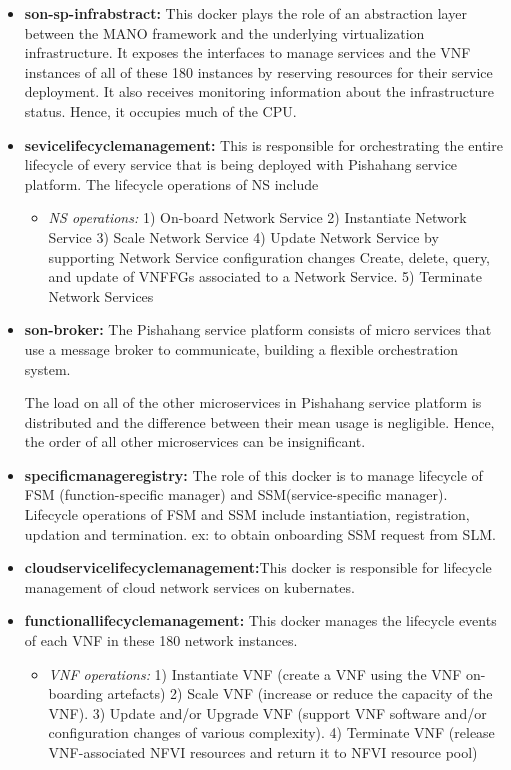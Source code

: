 \begin{itemize}
	\item \textbf{son-sp-infrabstract:} This docker plays the role of an abstraction layer between the MANO framework and the underlying virtualization infrastructure. It exposes the interfaces to manage services and the VNF instances of all of these 180 instances by reserving resources for their service deployment. It also receives monitoring information about the infrastructure status. Hence, it occupies much of the CPU.
	\item \textbf{sevicelifecyclemanagement:} This is responsible for orchestrating the entire lifecycle of every service that is being deployed with Pishahang service platform. The lifecycle operations of NS include
	
	\begin{itemize}
		\item \textit{NS operations:} 
		1) On-board Network Service
		2) Instantiate Network Service
		3) Scale Network Service
		4) Update Network Service by supporting Network Service configuration changes
		Create, delete, query, and update of VNFFGs associated to a Network Service.
		5) Terminate Network Services
		
	\end{itemize}

	\item \textbf{son-broker:} The Pishahang service platform consists of micro services that use a message broker to communicate, building a flexible orchestration system.
	
The load on all of the other microservices in Pishahang service platform is distributed and the difference between their mean usage is negligible. Hence, the order of all other microservices can be insignificant.

	
	\item \textbf{specificmanageregistry:} The role of this docker is to manage lifecycle of FSM (function-specific manager) and SSM(service-specific manager). Lifecycle operations of FSM and SSM include instantiation, registration, updation and termination. ex: to obtain onboarding SSM request from SLM.
	\item \textbf{cloudservicelifecyclemanagement:}This docker is responsible for lifecycle management of cloud network services on kubernates.
	\item \textbf{functionallifecyclemanagement:}  This docker manages the lifecycle events of each VNF in these 180 network instances. 

\begin{itemize}
		
	\item \textit{VNF operations:} 1) Instantiate VNF (create a VNF using the VNF on-boarding artefacts)
	2) Scale VNF (increase or reduce the capacity of the VNF).
	3) Update and/or Upgrade VNF (support VNF software and/or configuration changes of various complexity).
	4) Terminate VNF (release VNF-associated NFVI resources and return it to NFVI resource pool)
\end{itemize}
	\end{itemize}

